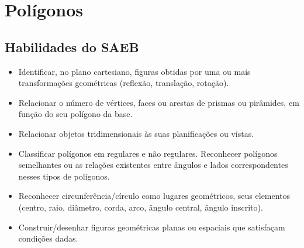 









\chapter{Polígonos}

\section*{Habilidades do SAEB}

\begin{itemize}
\item Identificar, no plano cartesiano, figuras obtidas
por uma ou mais transformações geométricas (reflexão, translação,
rotação).
\item
  Relacionar o número de vértices, faces ou arestas de prismas ou
  pirâmides, em função do seu polígono da base.
\item
  Relacionar objetos tridimensionais às suas planificações ou vistas.
\item
  Classificar polígonos em regulares e não regulares. Reconhecer
  polígonos semelhantes ou as relações existentes entre ângulos e lados
  correspondentes nesses tipos de polígonos.
\item
  Reconhecer circunferência/círculo como lugares geométricos, seus
  elementos (centro, raio, diâmetro, corda, arco, ângulo central, ângulo
  inscrito).
\item
  Construir/desenhar figuras geométricas planas ou espaciais que
  satisfaçam condições dadas.
\end{itemize}

